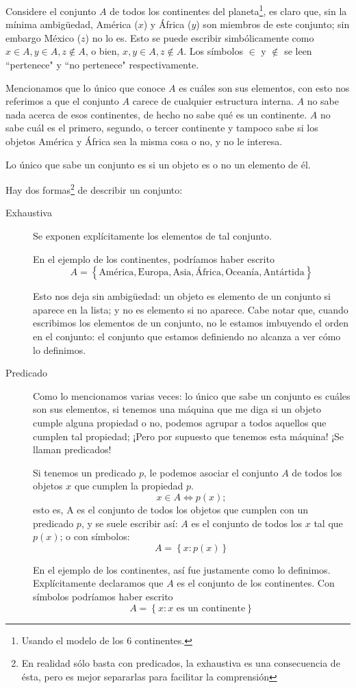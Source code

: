 \documentclass{book}
\newcommand{\set}[1]{\left\lbrace #1 \right\rbrace }
\theoremstyle{definition}
\begin{document}
Considere el conjunto $A$ de todos los continentes del planeta\footnote{Usando el modelo de los 6 continentes.}, es claro que, sin la mínima ambigüedad, América ($x$) y África ($y$) son miembros de este conjunto; sin embargo México ($z$) no lo es.
Esto se puede escribir simbólicamente como $x \in A, y\in A, z \notin A$, o bien, $x,y\in A, z\notin A$. 
Los símbolos $\in$ y $\notin$ se leen ``pertenece" y ``no pertenece" respectivamente.

Mencionamos que lo único que conoce $A$ es cuáles son sus elementos, con esto nos referimos a que el conjunto $A$ carece de cualquier estructura interna. $A$ no sabe nada acerca de esos continentes, de hecho no sabe qué es un continente. $A$ no sabe cuál es el primero, segundo, o tercer continente y tampoco sabe si los objetos América y África sea la misma cosa o no, y no le interesa.

Lo único que sabe un conjunto es si un objeto es o no un elemento de él.

Hay dos formas\footnote{En realidad sólo basta con predicados, la exhaustiva es una consecuencia de ésta, pero es mejor separarlas para facilitar la comprensión} de describir un conjunto:
\begin{description}
	\item[Exhaustiva] Se exponen explícitamente los elementos de tal conjunto.
	
	En el ejemplo de los continentes, podríamos haber escrito \[A = \set{\text{América}, \text{Europa}, \text{Asia}, \text{África}, \text{Oceanía}, \text{Antártida}}\]
	
	Esto nos deja sin ambigüedad: un objeto es elemento de un conjunto si aparece en la lista; y no es elemento si no aparece.
	Cabe notar que, cuando escribimos los elementos de un conjunto, no le estamos imbuyendo el orden en el conjunto: el conjunto que estamos definiendo no alcanza a ver cómo lo definimos.
	
	\item[Predicado] Como lo mencionamos varias veces: lo único que sabe un conjunto es cuáles son sus elementos, si tenemos una máquina que me diga si un objeto cumple alguna propiedad o no, podemos agrupar a todos aquellos que cumplen tal propiedad; ¡Pero por supuesto que tenemos esta máquina! ¡Se llaman predicados!
	
	Si tenemos un predicado $p$, le podemos asociar el conjunto $A$ de todos los objetos $x$ que cumplen la propiedad $p$. 
	\[x\in A \iff p(x);\]
	esto es, A es el conjunto de todos los objetos que cumplen con un predicado $p$, y se suele escribir así: $A$ es el conjunto de todos los $x$ tal que $p(x)$; o con símbolos:
	\[A = \set{x : p(x)}\]
	
	En el ejemplo de los continentes, así fue justamente como lo definimos. Explícitamente declaramos que $A$ es el conjunto de los continentes. Con símbolos podríamos haber escrito
	\[A = \set{x : x\text{ es un continente}}\]
\end{description}
\end{document}

